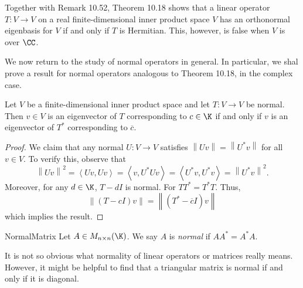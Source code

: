 \documentclass[linearalgebra]{subfiles}
\begin{document}
    \begin{remark}
        Together with Remark 10.52, Theorem 10.18 shows that a linear operator $T:V\to V$ on a real finite-dimensional inner product space $V$ has an orthonormal eigenbasis for $V$ if and only if $T$ is Hermitian. This, however, is false when $V$ is over $\CC$.
    \end{remark}

    \begin{remark}
        We now return to the study of normal operators in general. In particular, we shal prove a result for normal operators analogous to Theorem 10.18, in the complex case.
    \end{remark}

    \begin{prop}{}
        Let $V$ be a finite-dimensional inner product space and let $T:V\to V$ be normal. Then $v\in V$ is an eigenvector of $T$ corresponding to $c\in\K$ if and only if $v$ is an eigenvector of $T^*$ corresponding to $\overline{c}$.
    \end{prop}

    \begin{proof}
        We claim that any normal $U:V\to V$ satisfies $\left\lVert Uv\right\rVert = \left\lVert U^*v\right\rVert$ for all $v\in V$. To verify this, observe that
        \begin{equation*}
            \left\lVert Uv\right\rVert ^2 = \left\langle Uv, Uv\right\rangle = \left\langle v, U^*Uv\right\rangle = \left\langle U^*v, U^*v\right\rangle = \left\lVert U^*v\right\rVert ^2.
        \end{equation*}
        Moreover, for any $d\in\K$, $T-dI$ is normal. For $TT^* = T^*T$. Thus,
        \begin{equation*}
            \left\lVert \left( T-cI \right) v\right\rVert = \left\lVert \left( T^*-\overline{c} I \right) v\right\rVert 
        \end{equation*}
        which implies the result.
    \end{proof}

    \begin{definition}{Normal}{Matrix}
        Let $A\in M_{n\times n}(\K)$. We say $A$ is \emph{normal} if $AA^* = A^*A$.
    \end{definition}

    \begin{remark}
        It is not so obvious what normality of linear operators or matrices really means. However, it might be helpful to find that a triangular matrix is normal if and only if it is diagonal.
    \end{remark}
\end{document}
